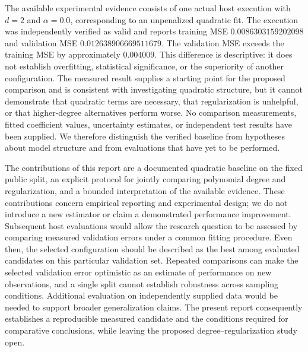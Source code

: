 \documentclass[11pt]{article}
\begin{document}
The available experimental evidence consists of one actual host execution with \(d=2\) and \(\alpha=0.0\), corresponding to an unpenalized quadratic fit. The execution was independently verified as valid and reports training MSE \(0.0086303159202098\) and validation MSE \(0.012638906669511679\). The validation MSE exceeds the training MSE by approximately \(0.004009\). This difference is descriptive: it does not establish overfitting, statistical significance, or the superiority of another configuration. The measured result supplies a starting point for the proposed comparison and is consistent with investigating quadratic structure, but it cannot demonstrate that quadratic terms are necessary, that regularization is unhelpful, or that higher-degree alternatives perform worse. No comparison measurements, fitted coefficient values, uncertainty estimates, or independent test results have been supplied. We therefore distinguish the verified baseline from hypotheses about model structure and from evaluations that have yet to be performed.

The contributions of this report are a documented quadratic baseline on the fixed public split, an explicit protocol for jointly comparing polynomial degree and regularization, and a bounded interpretation of the available evidence. These contributions concern empirical reporting and experimental design; we do not introduce a new estimator or claim a demonstrated performance improvement. Subsequent host evaluations would allow the research question to be assessed by comparing measured validation errors under a common fitting procedure. Even then, the selected configuration should be described as the best among evaluated candidates on this particular validation set. Repeated comparisons can make the selected validation error optimistic as an estimate of performance on new observations, and a single split cannot establish robustness across sampling conditions. Additional evaluation on independently supplied data would be needed to support broader generalization claims. The present report consequently establishes a reproducible measured candidate and the conditions required for comparative conclusions, while leaving the proposed degree--regularization study open.
\end{document}
